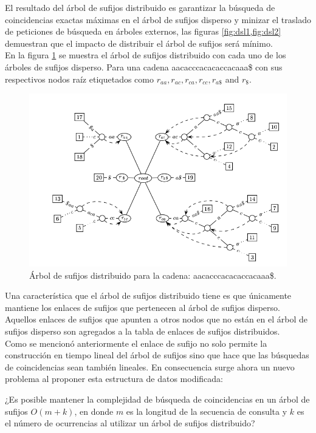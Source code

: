 \documentclass[12pt,a4paper]{article}
\begin{document}
El resultado del árbol de sufijos distribuido es garantizar la búsqueda de coincidencias exactas máximas en el árbol de sufijos disperso y minizar el traslado de peticiones de búsqueda en árboles externos, las figuras \ref{fig:dsl1,fig:dsl2} demuestran que el impacto de distribuir el árbol de sufijos será mínimo.\\
\indent
En la figura \ref{fig:dst} se muestra el árbol de sufijos distribuido con cada uno de los árboles de sufijos disperso. Para una
cadena aacacccacacaccacaaa\$ con sus respectivos nodos raíz etiquetados como $r_{aa}, r_{ac}, r_{ca}, r_{cc}, r_{a\$}$ and $r_{\$}$.
\begin{figure}[h]
\begin{center}
\includegraphics[scale=0.4]{dst2.png}
\caption{Árbol de sufijos distribuido para la cadena: aacacccacacaccacaaa\$.}
\label{fig:dst}
\end{center}
\end{figure}
Una característica que el árbol de sufijos distribuido tiene es que únicamente mantiene los enlaces de sufijos que pertenecen al 
árbol de sufijos disperso. Aquellos enlaces de sufijos que apunten a otros nodos que no están en el árbol de sufijos disperso
son agregados a la tabla de enlaces de sufijos distribuidos.\\
Como se mencionó anteriormente el enlace de sufijo no solo permite la construcción en tiempo lineal del árbol de sufijos sino
que hace que las búsquedas de coincidencias sean tambi\'en lineales. En consecuencia surge ahora un nuevo problema al proponer
esta estructura de datos modificada:\\
\begin{center}
  ¿Es posible mantener la complejidad de búsqueda de coincidencias en un árbol de sufijos $O(m+k)$, en donde $m$ es la
  longitud de la secuencia de consulta y $k$ es el número de ocurrencias al utilizar un árbol de sufijos distribuido?
\end{center}
\end{document}
